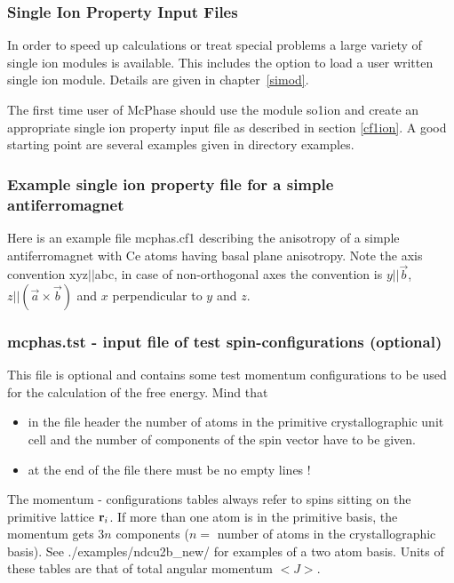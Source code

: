 \subsubsection{Single Ion Property Input Files}\label{sifile}

In order to speed up calculations or treat special problems a large 
variety of single ion modules is available. This includes the
option to load a user written single ion module. Details are 
given in chapter~\ref{simod}.

The first time user of {\prg McPhase} should use the module {\prg so1ion} and 
create an appropriate single ion property input file as described in
section \ref{cf1ion}. A good starting point are several examples
given in directory {\prg examples}.


\subsubsection{Example single ion property file  for a simple antiferromagnet}

Here is an example file {\prg mcphas.cf1} describing the anisotropy of a 
simple antiferromagnet with Ce atoms having basal plane anisotropy. Note the
axis convention xyz$||$abc, in case of non-orthogonal axes the convention 
is $y||\vec b$, $z||(\vec a \times \vec b)$ and $x$ perpendicular to $y$ and $z$.




\subsubsection{{\prg mcphas.tst} - input file of test spin-configurations (optional)}
This file is optional and contains
some test momentum configurations to be used for the calculation
             of the free energy. Mind that
\begin{itemize}
\item  in the file header the number of atoms in the primitive
       crystallographic unit cell and the number of components
       of the spin vector have to be given.
\item  at the end of the
 file there must be no empty lines !
\end{itemize}

The momentum - configurations tables always refer to spins sitting on
the primitive lattice ${\mathbf r}_i$. If more than one atom is in
the primitive basis, the momentum gets $3n$ components ($n=$ number
of atoms in the crystallographic basis). See {\prg ./examples/ndcu2b\_new/} for
examples of a two atom basis. Units of these tables are that of total 
angular momentum $<J>$.

